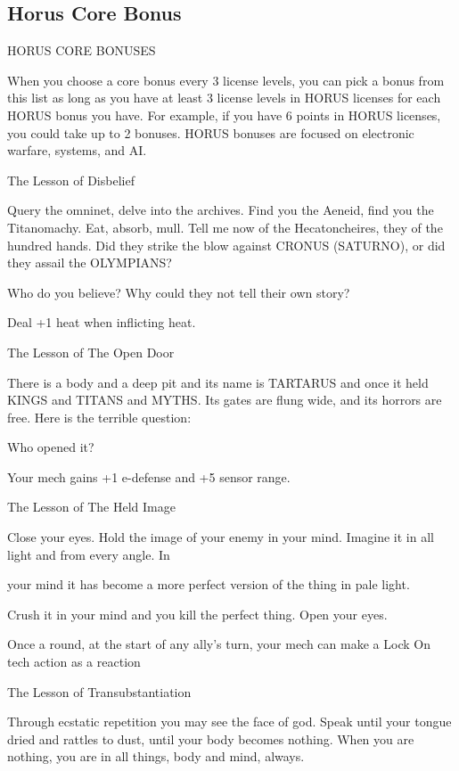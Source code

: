 \subsection{Horus Core Bonus}

                                      HORUS CORE BONUSES  

When you choose a core bonus every 3 license levels, you can pick a bonus from this list as long  
as you have at least 3 license levels in HORUS licenses for each HORUS bonus you have. For  
example, if you have 6 points in HORUS licenses, you could take up to 2 bonuses. HORUS  
bonuses are focused on electronic warfare, systems, and AI.
 

The Lesson of Disbelief  

Query the omninet, delve into the archives. Find you the Aeneid, find you the Titanomachy. Eat, absorb,  
mull. Tell me now of the Hecatoncheires, they of the hundred hands. Did they strike the blow against  
CRONUS (SATURNO), or did they assail the OLYMPIANS?   

Who do you believe? Why could they not tell their own story?   

Deal +1 heat when inflicting heat.
 

The Lesson of The Open Door   

There is a body and a deep pit and its name is TARTARUS and once it held KINGS and TITANS and  
MYTHS. Its gates are flung wide, and its horrors are free. Here is the terrible question:
 
Who opened it?   

Your mech gains +1 e-defense and +5 sensor range.
 

The Lesson of The Held Image  

Close your eyes. Hold the image of your enemy in your mind. Imagine it in all light and from every angle. In  

your mind it has become a more perfect version of the thing in pale light. 
 
Crush it in your mind and you kill the perfect thing. Open your eyes.    

Once a round, at the start of any ally’s turn, your mech can make a Lock On tech action as a  
reaction
 

The Lesson of Transubstantiation  

Through ecstatic repetition you may see the face of god. Speak until your tongue dried and rattles to dust,  
until your body becomes nothing. When you are nothing, you are in all things, body and mind, always.    

